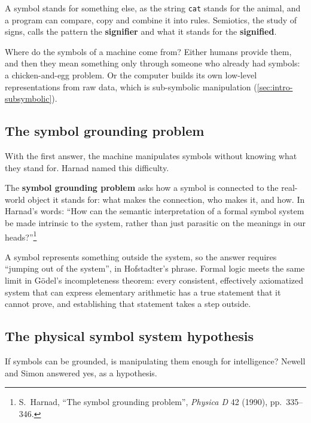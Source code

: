 A symbol stands for something else, as the string \texttt{cat} stands for the
animal, and a program can compare, copy and combine it into rules. Semiotics,
the study of signs, calls the pattern the \textbf{signifier} and what it stands
for the \textbf{signified}.

Where do the symbols of a machine come from? Either humans provide them, and
then they mean something only through someone who already had symbols: a
chicken-and-egg problem. Or the computer builds its own low-level representations from raw
data, which is sub-symbolic manipulation (\cref{sec:intro-subsymbolic}).

\subsection{The symbol grounding problem}\label{sec:intro-grounding}

With the first answer, the machine manipulates symbols without knowing what
they stand for. Harnad named this difficulty.

\begin{definition}\label{def:grounding}
  The \textbf{symbol grounding problem} asks how a symbol is connected to the
  real-world object it stands for: what makes the connection, who makes it,
  and how. In Harnad's words: ``How can the semantic interpretation of a
  formal symbol system be made intrinsic to the system, rather than just
  parasitic on the meanings in our heads?''\footnote{S.~Harnad, ``The symbol
  grounding problem'', \emph{Physica D} 42 (1990), pp.~335--346.}
\end{definition}

A symbol represents something outside the system, so the answer requires
``jumping out of the system'', in Hofstadter's phrase. Formal logic meets the
same limit in Gödel's incompleteness theorem: every consistent, effectively
axiomatized system that can express elementary arithmetic has a true statement
that it cannot prove, and establishing that statement takes a step outside.

\subsection{The physical symbol system hypothesis}\label{sec:intro-pssh}

If symbols can be grounded, is manipulating them enough for intelligence?
Newell and Simon answered yes, as a hypothesis.

